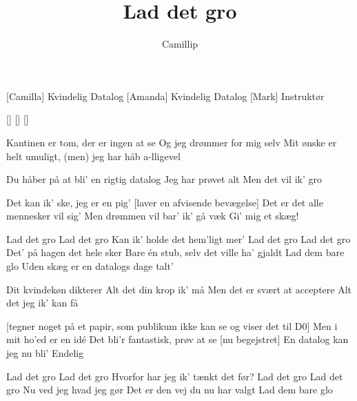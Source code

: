 \documentclass[a4paper,11pt]{article}
\title{Lad det gro}
\author{Camillip}
\begin{document}
\maketitle

\begin{roles}
[Camilla] Kvindelig Datalog
[Amanda] Kvindelig Datalog
[Mark] Instruktør
\end{roles}

\begin{props}
[]
[]
[]
\end{props}

\begin{song}

 Kantinen er tom, der er ingen at se
Og jeg drømmer for mig selv
Mit ønske er helt umuligt, (men) jeg har håb a-lligevel


 Du håber på at bli' en rigtig datalog
 Jeg har prøvet alt
Men det vil ik' gro

 Det kan ik' ske, jeg er en pig'
[laver en afvisende bevægelse] 
Det er det alle mennesker vil sig'
 Men drømmen vil bar' ik' gå væk
Gi' mig et skæg!

 Lad det gro
Lad det gro
Kan ik' holde det hem'ligt mer'
 Lad det gro
Lad det gro
Det' på hagen det hele sker
 Bare én stub, selv det ville ha' gjaldt
Lad dem bare glo
 Uden skæg er en datalogs dage talt'

 Dit kvindekøn dikterer
Alt det din krop ik' må
 Men det er svært at acceptere
Alt det jeg ik' kan få

[tegner noget på et papir, som publikum ikke kan se og viser det til D0]
Men i mit ho'ed er en idé
Det bli'r fantastisk, prøv at se
[nu begejstret] 
En datalog kan jeg nu bli'
Endelig

 Lad det gro
Lad det gro
 Hvorfor har jeg ik' tænkt det før?
 Lad det gro
Lad det gro
 Nu ved jeg hvad jeg gør
 Det er den vej du nu har valgt
Lad dem bare glo



\end{song}
\end{document}
